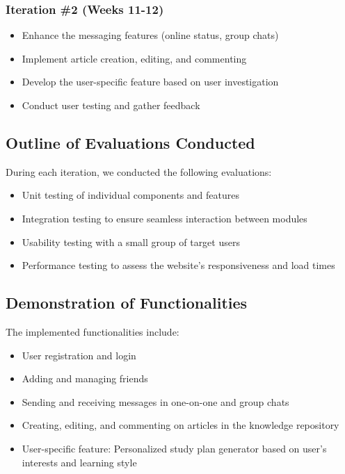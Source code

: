 \documentclass[12pt]{article}
\begin{document}
\subsubsection{Iteration \#2 (Weeks 11-12)}
\begin{itemize}
    \item Enhance the messaging features (online status, group chats)
    \item Implement article creation, editing, and commenting
    \item Develop the user-specific feature based on user investigation
    \item Conduct user testing and gather feedback
\end{itemize}

\subsection{Outline of Evaluations Conducted}
During each iteration, we conducted the following evaluations:

\begin{itemize}
    \item Unit testing of individual components and features
    \item Integration testing to ensure seamless interaction between modules
    \item Usability testing with a small group of target users
    \item Performance testing to assess the website's responsiveness and load times
\end{itemize}

\subsection{Demonstration of Functionalities}
The implemented functionalities include:

\begin{itemize}
    \item User registration and login
    \item Adding and managing friends
    \item Sending and receiving messages in one-on-one and group chats
    \item Creating, editing, and commenting on articles in the knowledge repository
    \item User-specific feature: Personalized study plan generator based on user's interests and learning style
\end{itemize}
\end{document}
